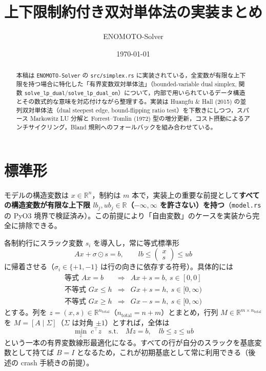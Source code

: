 \documentclass[11pt,a4paper]{ltjsarticle}
\title{上下限制約付き双対単体法の実装まとめ}
\author{ENOMOTO-Solver \quad \code{src/simplex.rs}}
\date{\today}
\newcommand{\R}{\mathbb{R}}
\newcommand{\code}[1]{\texttt{#1}}
\begin{document}
\maketitle

\begin{abstract}
本稿は \code{ENOMOTO-Solver} の \code{src/simplex.rs} に実装されている，全変数が有限な上下限を持つ場合に特化した「有界変数双対単体法」（bounded-variable dual simplex, 関数 \code{solve\_lp\_dual}/\code{solve\_lp\_dual\_on}）について，内部で用いられているデータ構造とその数式的な意味を対応付けながら整理する。実装は Huangfu \& Hall (2015) の並列双対単体法（dual steepest edge, bound-flipping ratio test）を下敷きにしつつ，スパース Markowitz LU 分解と Forrest--Tomlin (1972) 型の増分更新，コスト摂動によるアンチサイクリング，Bland 規則へのフォールバックを組み合わせている。
\end{abstract}

\tableofcontents

\section{標準形}

モデルの構造変数は $x \in \R^n$，制約は $m$ 本で，実装上の重要な前提として\textbf{すべての構造変数が有限な上下限 $lb_j, ub_j \in \R$（$-\infty,\infty$ を許さない）を持つ}（\code{model.rs} の PyO3 境界で検証済み）。この前提により「自由変数」のケースを実装から完全に排除できる。

各制約行にスラック変数 $s_i$ を導入し，常に等式標準形
\[
  A x + \sigma \odot s = b, \qquad lb \le \begin{pmatrix}x\\s\end{pmatrix} \le ub
\]
に帰着させる（$\sigma_i \in \{+1,-1\}$ は行の向きに依存する符号）。具体的には
\[
\begin{array}{lll}
  \text{等式 } Ax = b & \Rightarrow & Ax + s = b,\ s \in [0,0] \\
  \text{不等式 } Gx \le h & \Rightarrow & Gx + s = h,\ s \in [0,\infty) \\
  \text{不等式 } Gx \ge h & \Rightarrow & Gx - s = h,\ s \in [0,\infty)
\end{array}
\]
とする。列を $z = (x,s) \in \R^{n_{\mathrm{total}}}$（$n_{\mathrm{total}} = n + m$）とまとめ，行列 $M \in \R^{m \times n_{\mathrm{total}}}$ を $M = [A \mid \Sigma]$（$\Sigma$ は対角 $\pm1$）とすれば，全体は
\[
  \min_{z} \; c^\top z \quad \text{s.t.} \quad Mz = b,\quad lb \le z \le ub
\]
という一本の有界変数線形最適化になる。すべての行が自分のスラックを基底変数として持てば $B = I$ となるため，これが初期基底として常に利用できる（後述の crash 手続きの前提）。
\end{document}
